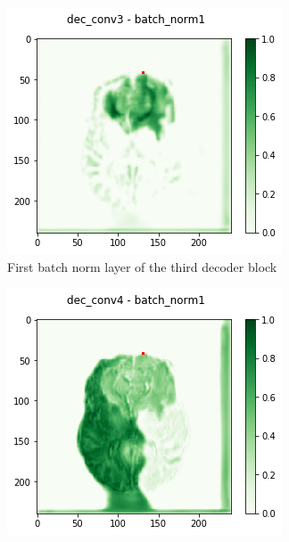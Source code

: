 \begin{figure}[H]
    \begin{subfigure}{.33\textwidth}
        \centering
        \includegraphics[width=\linewidth]{chapters/04_segmentation/images/grad_cam_30.png}
        \caption{First batch norm layer of the third decoder block}
    \end{subfigure}\hfill%
    \begin{subfigure}{.32\textwidth}
        \centering
        \includegraphics[width=\linewidth]{chapters/04_segmentation/images/grad_cam_34.png}

\end{subfigure}
\end{figure}
